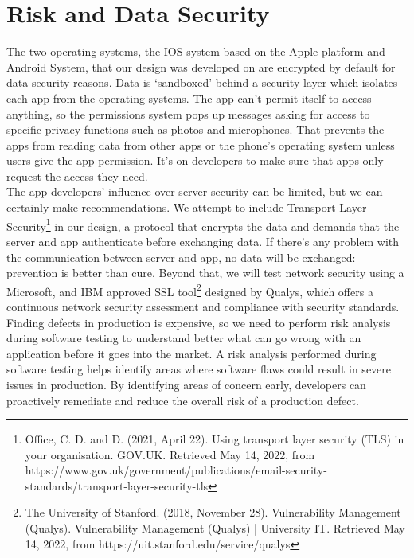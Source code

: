 \section{Risk and Data Security}
The two operating systems, the IOS system based on the Apple platform and Android System, that our design was developed on are encrypted by default for data security reasons. Data is ‘sandboxed’ behind a security layer which isolates each app from the operating systems. The app can’t permit itself to access anything, so the permissions system pops up messages asking for access to specific privacy functions such as photos and microphones. That prevents the apps from reading data from other apps or the phone’s operating system unless users give the app permission. It’s on developers to make sure that apps only request the access they need. 
 \\The app developers’ influence over server security can be limited, but we can certainly make recommendations. We attempt to include Transport Layer Security\footnote{Office, C. D. and D. (2021, April 22). Using transport layer security (TLS) in your organisation. GOV.UK. Retrieved May 14, 2022, from https://www.gov.uk/government/publications/email-security-standards/transport-layer-security-tls} in our design, a protocol that encrypts the data and demands that the server and app authenticate before exchanging data. If there’s any problem with the communication between server and app, no data will be exchanged: prevention is better than cure. Beyond that, we will test network security using a Microsoft, and IBM approved SSL tool\footnote{The University of Stanford. (2018, November 28). Vulnerability Management (Qualys). Vulnerability Management (Qualys) | University IT. Retrieved May 14, 2022, from https://uit.stanford.edu/service/qualys } designed by Qualys, which offers a continuous network security assessment and compliance with security standards.
 \\Finding defects in production is expensive, so we need to perform risk analysis during software testing to understand better what can go wrong with an application before it goes into the market. A risk analysis performed during software testing helps identify areas where software flaws could result in severe issues in production. By identifying areas of concern early, developers can proactively remediate and reduce the overall risk of a production defect.

